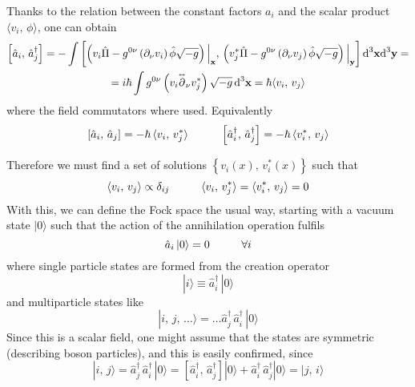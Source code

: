 Thanks to the relation between the constant factors $a_i$ and the scalar product $\langle v_i,\,\phi\rangle$, one can obtain
\begin{multline}
	\left[\hat{a}_i,\,\hat{a}_j^\dagger\right]=-\int\left[\left(v_i\hat{\Pi}-g^{0\nu}\left(\partial_\nu v_i\right)\hat{\phi}\sqrt{-g}\right)\Big|_\mathbf{x},\,\left(v_j^*\hat{\Pi}-g^{0\nu}\left(\partial_\nu v_j\right)\hat{\phi}\sqrt{-g}\right)\Big|_\mathbf{y}\right]\text{d}^3\mathbf{x}\text{d}^3\mathbf{y}=\\
	=i\hbar\int g^{0\nu}\left(v_i\overset{\text{\tiny$\leftrightarrow$}}{\partial}_\nu v_j^*\right)\sqrt{-g}\,\text{d}^3\mathbf{x}=\hbar\langle v_i,\,v_j\rangle
\end{multline}
where the field commutators where used. Equivalently 
\begin{equation}
	\left[\hat{a}_i,\,\hat{a}_j\right]=-\hbar\,\langle v_i,\,v_j^*\rangle\hspace{1.0cm}\left[\hat{a}_i^\dagger,\,\hat{a}_j^\dagger\right]=-\hbar\,\langle v_i^*,\,v_j\rangle
\end{equation}

Therefore we must find a set of solutions $\left\{v_i(x),\,v_i^*(x)\right\}$ such that
\begin{equation}
	\langle v_i,\,v_j\rangle\propto \delta_{ij}\hspace{1.0cm}\langle v_i,\,v_j^*\rangle=\langle v_i^*,\,v_j\rangle=0
\end{equation}
With this, we can define the Fock space the usual way, starting with a vacuum state $|0\rangle$ such that the action of the annihilation operation fulfils
\begin{equation}
	\hat{a}_i\,|0\rangle=0\hspace{1.0cm}\forall i
\end{equation}
where single particle states are formed from the creation operator
\begin{equation}
	|i\rangle\equiv \hat{a}^\dagger_i\,|0\rangle
\end{equation}
and multiparticle states like
\begin{equation}
	|i,\,j,\,\hdots\rangle=\hdots \hat{a}_j^\dagger\,\hat{a}_i^\dagger\,|0\rangle
\end{equation}
Since this is a scalar field, one might assume that the states are symmetric (describing boson particles), and this is easily confirmed, since
\begin{equation}
	|i,\,j\rangle=\hat{a}_j^\dagger\,\hat{a}_i^\dagger\,|0\rangle=\left[\hat{a}_i^\dagger,\,\hat{a}_j^\dagger\right]|0\rangle+\hat{a}_i^\dagger\,\hat{a}_j^\dagger|0\rangle=|j,\,i\rangle
\end{equation}
